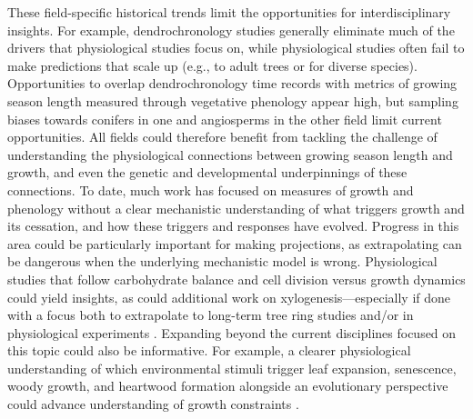 \documentclass[11pt]{article}
\begin{document}
These field-specific historical trends limit the opportunities for interdisciplinary insights. For example, dendrochronology studies generally eliminate much of the drivers that physiological studies focus on, while physiological studies often fail to make predictions that scale up (e.g., to adult trees or for diverse species). Opportunities to overlap dendrochronology time records with metrics of growing season length measured through vegetative phenology appear high, but sampling biases towards conifers in one and angiosperms in the other field limit current opportunities. All fields could therefore benefit from tackling the challenge of understanding the physiological connections between growing season length and growth, and even the genetic and developmental underpinnings of these connections. To date, much work has focused on measures of growth and phenology without a clear mechanistic understanding of what triggers growth and its cessation, and how these triggers and responses have evolved.  %
Progress in this area could be particularly important for making projections, as extrapolating can be dangerous when the underlying mechanistic model is wrong. Physiological studies that follow carbohydrate balance and cell division \citep[see][]{locosselli2017dendrobiochemistry} versus growth dynamics could yield insights, as could additional work on xylogenesis---especially if done with a focus both to extrapolate to long-term tree ring studies and/or in physiological experiments \citep{fang2020physiological,simard2013intra}. Expanding beyond the current disciplines focused on this topic could also be informative. For example, a clearer physiological understanding of which environmental stimuli trigger leaf expansion, senescence, woody growth, and heartwood formation alongside an evolutionary perspective could advance understanding of growth
constraints \citep{baas2011wood,eckert2019makes,ensminger2015tree,juvany2013photo}.

\end{document}
